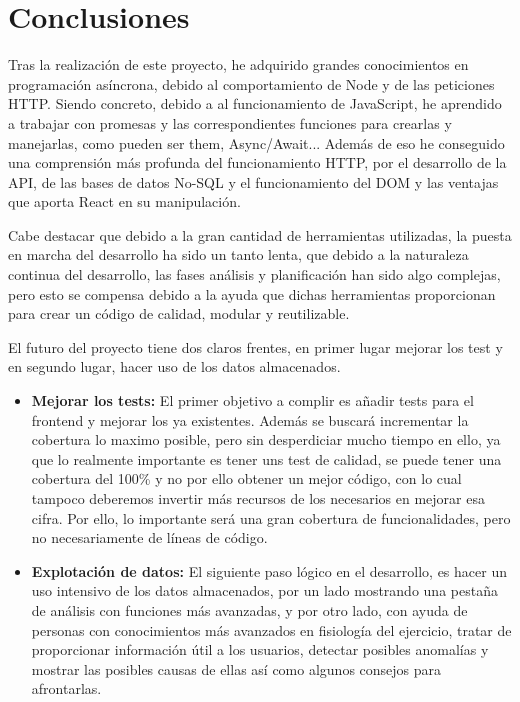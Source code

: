 \chapter{Conclusiones}

Tras la realización de este proyecto, he adquirido grandes conocimientos en programación asíncrona, debido al comportamiento de Node y de las peticiones HTTP. Siendo concreto, debido a al funcionamiento de JavaScript, he aprendido a trabajar con promesas y las correspondientes funciones para crearlas y manejarlas, como pueden ser them, Async/Await... Además de eso he conseguido una comprensión más profunda del funcionamiento HTTP, por el desarrollo de la API, de las bases de datos No-SQL y el funcionamiento del DOM y las ventajas que aporta React en su manipulación.

Cabe destacar que debido a la gran cantidad de herramientas utilizadas, la puesta en marcha del desarrollo ha sido un tanto lenta, que debido a la naturaleza continua del desarrollo, las fases análisis y planificación han sido algo complejas, pero esto se compensa debido a la ayuda que dichas herramientas proporcionan para crear un código de calidad, modular y reutilizable.

El futuro del proyecto tiene dos claros frentes, en primer lugar mejorar los test y en segundo lugar, hacer uso de los datos almacenados.
\begin{itemize}
  \item \textbf{Mejorar los tests: } El primer objetivo a complir es añadir tests para el frontend y mejorar los ya existentes. Además se buscará incrementar la cobertura lo maximo posible, pero sin desperdiciar mucho tiempo en ello, ya que lo realmente importante es tener uns test de calidad, se puede tener una cobertura del 100\% y no por ello obtener un mejor código, con lo cual tampoco deberemos invertir más recursos de los necesarios en mejorar esa cifra. Por ello, lo importante será una gran cobertura de funcionalidades, pero no necesariamente de líneas de código.
  \item \textbf{Explotación de datos: } El siguiente paso lógico en el desarrollo, es hacer un uso intensivo de los datos almacenados, por un lado mostrando una pestaña de análisis con funciones más avanzadas, y por otro lado, con ayuda de personas con conocimientos más avanzados en fisiología del ejercicio, tratar de proporcionar información útil a los usuarios, detectar posibles anomalías y mostrar las posibles causas de ellas así como algunos consejos para afrontarlas.
\end{itemize}

